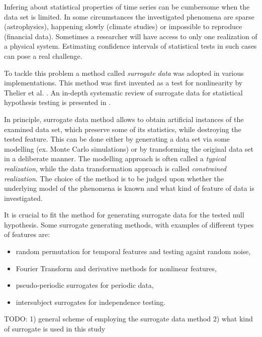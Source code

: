 Infering about statistical properties of time series can be cumbersome when the data set is limited.
In some circumstances the investigated phenomena are sparse (astrophysics), happening slowly (climate studies) or impossible to reproduce (financial data).
Sometimes a researcher will have access to only one realization of a physical system.
Estimating confidence intervals of statistical tests in such cases can pose a real challenge.

To tackle this problem a method called \emph{surrogate data} was adopted in various implementations.
This method was first invented as a test for nonlinearity by Thelier et al. \cite{1992-thelier}.
An in-depth systematic review of surrogate data for statistical hypothesis testing is presented in \cite{2018-lancaster}.

In principle, surrogate data method allows to obtain artificial instances of the examined data set, which preserve some of its statistics, while destroying the tested feature.
This can be done either by generating a data set via some modelling (ex. Monte Carlo simulations) or by transforming the original data set in a deliberate manner.
The modelling approach is often called a \emph{typical realization}, while the data transformation approach is called \emph{constrained realization}.
The choice of the method is to be judged upon whether the underlying model of the phenomena is known and what kind of feature of data is investigated. 

It is crucial to fit the method for generating surrogate data for the tested null hypothesis.
Some surrogate generating methods, with examples of different types of features are:
\begin{itemize}
    \item random permutation for temporal features and testing againt random noise,
    \item Fourier Transform and derivative methods for nonlinear features,
    \item pseudo-periodic surrogates for periodic data,
    \item intersubject surrogates for independence testing.
\end{itemize}

TODO:
1) general scheme of employing the surrogate data method
2) what kind of surrogate is used in this study
